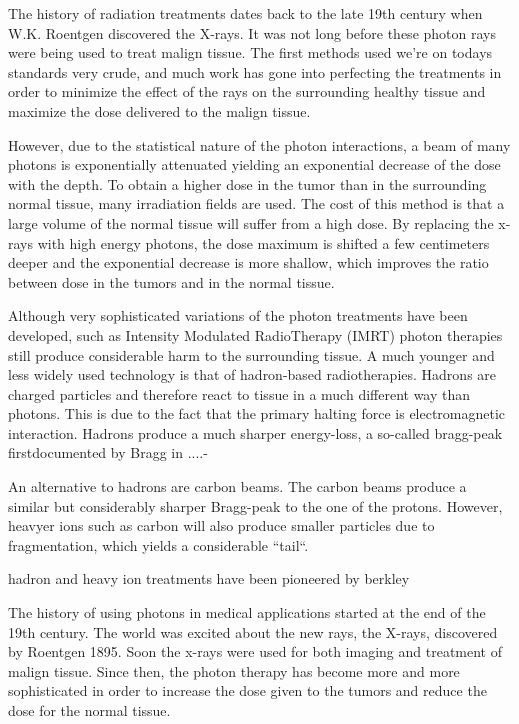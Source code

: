 The history of radiation treatments dates back to the late 19th century when W.K. Roentgen discovered the X-rays. It was not long before these photon rays were being used to treat malign tissue. The first methods used we're on todays standards very crude, and much work has gone into perfecting the treatments in order to minimize the effect of the rays on the surrounding healthy tissue and maximize the dose delivered to the malign tissue.

However, due to the statistical nature of the photon interactions, a beam of many photons is
exponentially attenuated yielding an exponential decrease of the dose with the depth. To
obtain a higher dose in the tumor than in the surrounding normal tissue, many irradiation
fields are used. The cost of this method is that a large volume of the normal tissue
will suffer from a high dose. By replacing the x-rays with high energy photons, the dose
maximum is shifted a few centimeters deeper and the exponential decrease is more shallow,
which improves the ratio between dose in the tumors and in the normal tissue.

Although very sophisticated variations of the photon treatments have been developed, such as Intensity Modulated RadioTherapy (IMRT) photon therapies still produce considerable harm to the surrounding tissue. A much younger and less widely used technology is that of hadron-based radiotherapies. Hadrons are charged particles and therefore react to tissue in a much different way than photons. This is due to the fact that the primary halting force is electromagnetic interaction. Hadrons produce a much sharper energy-loss, a so-called bragg-peak firstdocumented by Bragg in ....-

An alternative to hadrons are carbon beams. The carbon beams produce a similar but considerably sharper Bragg-peak to the one of the protons. However, heavyer ions such as carbon will also produce smaller particles due to fragmentation, which yields a considerable ``tail``.

hadron and heavy ion treatments have been pioneered by berkley

The history of using photons in medical applications started at the end of the 19th century.
The world was excited about the new rays, the X-rays, discovered by Roentgen 1895. Soon
the x-rays were used for both imaging and treatment of malign tissue. Since then, the
photon therapy has become more and more sophisticated in order to increase the dose
given to the tumors and reduce the dose for the normal tissue.

